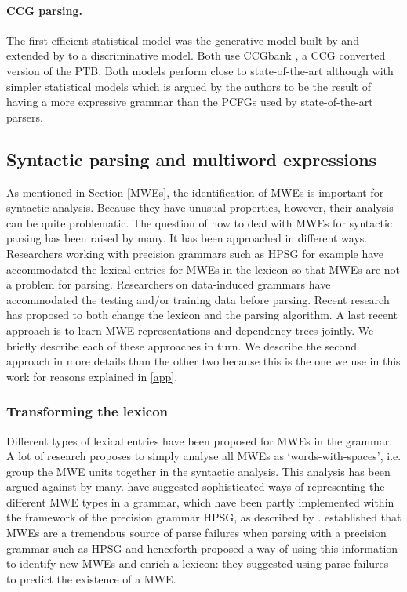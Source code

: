 \documentclass[output=paper]{LSP/langsci}
\begin{document}
                        \paragraph*{CCG parsing.}
                        \indent The first efficient statistical model was the generative model built by \citet{hockenmaier2002} and extended by \citet{clarkcurran2007} to a discriminative model. Both use CCGbank \citep{hockenmaier2007}, a CCG converted version of the PTB. Both models perform close to state-of-the-art although with simpler statistical models which is argued by the authors to be the result of having a more expressive grammar than the PCFGs used by state-of-the-art parsers.

                        \subsection{Syntactic parsing and multiword expressions}
                        \label{syntacticparsingandMWES}
                        \indent As mentioned in Section \ref{MWEs}, the identification of MWEs is important for syntactic analysis. Because they have unusual properties, however, their analysis can be quite problematic. The question of how to deal with MWEs for syntactic parsing has been raised by many. It has been approached in different ways. Researchers working with precision grammars such as HPSG for example have accommodated the lexical entries for MWEs in the lexicon so that MWEs are not a problem for parsing. Researchers on data-induced grammars have accommodated the testing and/or training data before parsing. Recent research has proposed to both change the lexicon and the parsing algorithm. A last recent approach is to learn MWE representations and dependency trees jointly. We briefly describe each of these approaches in turn. We describe the second approach in more details than the other two because this is the one we use in this work for reasons explained in \ref{app}.

                        \subsubsection{Transforming the lexicon}
                        \indent Different types of lexical entries have been proposed for MWEs in the grammar. A lot of research proposes to simply analyse all MWEs as `words-with-spaces', i.e. group the MWE units together in the syntactic analysis. This analysis has been argued against by many. \citet{sag02} have suggested sophisticated ways of representing the different MWE types in a grammar, which have been partly implemented within the framework of the precision grammar HPSG, as described by \citet{copestakeetal2002}. \citet{zhangetal2006} established that MWEs are a tremendous source of parse failures when parsing with a precision grammar such as HPSG and henceforth proposed a way of using this information to identify new MWEs and enrich a lexicon: they suggested using parse failures to predict the existence of a MWE.
\end{document}
